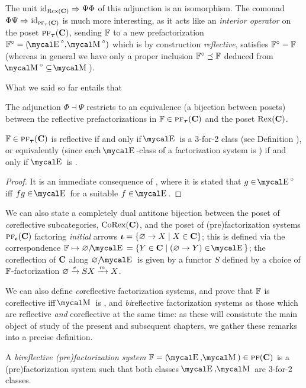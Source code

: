 \begin{remark}
The unit $\text{id}_{\text{Rex}(\textbf{C})}\Rightarrow\Psi\Phi$ of this adjunction is an isomorphism. The comonad $\Phi\Psi\Rightarrow \text{id}_{\text{\scshape pf}_{\boldsymbol{\tau}}(\textbf{C})}$ is much more interesting, as it acts like an \emph{interior operator} on the poset $\text{\scshape pf}_{\boldsymbol{\tau}}(\textbf{C})$, sending $\mathbb{F}$ to a new prefactorization $\fF^\circ=(\EE^\circ,\MM^\circ)$ which is by construction \emph{reflective}, \ie satisfies $\mathbb{F}^\circ=\mathbb{F}$ (whereas in general we have only a proper inclusion $\mathbb{F}^\circ\preceq \mathbb{F}$ deduced from $\MM^\circ\subseteq \MM$). 
\end{remark}
What we said so far entails that
\begin{proposition}
The adjunction $\Phi\dashv\Psi$ restricts to an equivalence (a bijection between posets) between the reflective prefactorizations in $\mathbb{F}\in \text{\scshape pf}_{\boldsymbol{\tau}}(\textbf{C})$ and the poset $\text{Rex}(\textbf{C})$.
\end{proposition}
\begin{proposition}\label{refective}
$\mathbb{F}\in \text{\scshape pf}_{\boldsymbol{\tau}}(\textbf{C})$ is reflective if and only if $\EE$ is a 3\hyp{}for\hyp{}2 class (see Definition ), or equivalently (since each $\EE$\hyp{}class of a factorization system is ) if and only if $\EE$ is .
\end{proposition}
\begin{proof}
It is an immediate consequence of \cite[Thm. \textbf{2.3}]{CHK}, where it is stated that $g\in\EE^\circ$ iff $fg\in\EE$ for a suitable $f\in \EE$.
\end{proof}
\begin{remark}\label{coref.and.such}
We can also state a completely dual antitone bijection between the poset of \emph{co}reflective subcategories, $\text{CoRex}(\textbf{C})$, and the poset of (pre)factorization systems $\text{\scshape pf}_{\boldsymbol{\iota}}(\textbf{C})$ factoring \emph{initial} arrows $\boldsymbol{\iota}=\{\varnothing\to X\mid X\in\textbf{C}\}$; this is defined via the correspondence $\fF \mapsto \varnothing/\EE = \{Y\in\CC\mid (\varnothing \to Y)\in\EE\}$; the coreflection of $\textbf{C}$ along $\varnothing/\EE$ is given by a functor $S$ defined by a choice of $\mathbb{F}$\hyp{}factorization $\varnothing\xrightarrow{e}SX\xrightarrow{m}X$.
\end{remark}
\begin{remark}\label{biref}
We can also define \emph{co}reflective factorization systems, and prove that $\mathbb{F}$ is coreflective iff $\MM$ is , and \emph{bi}reflective factorization systems as those which are reflective \emph{and} coreflective at the same time: as these will consistute the main object of study of the present and subsequent chapters, we gather these remarks into a precise definition.
\end{remark}
\begin{definition}\label{def:reflective.fs}
A \emph{bireflective (pre)factorization system} $\fF = (\EE, \MM)\in \pf(\CC)$ is a (pre)factorization system such that both classes $\EE, \MM$ are 3\hyp{}for\hyp{}2 classes.
\end{definition}
